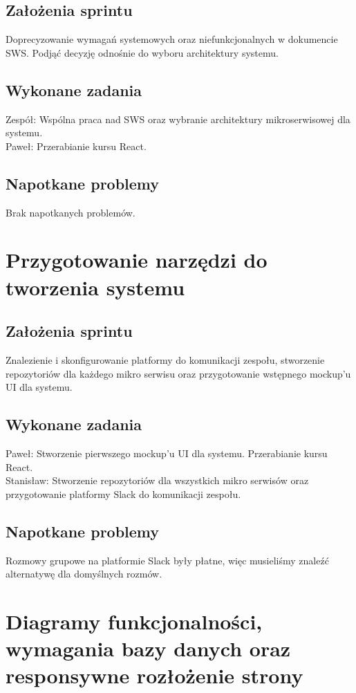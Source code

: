 \documentclass[a4paper,11pt]{report}
\begin{document}
\subsection {Założenia sprintu}
Doprecyzowanie wymagań systemowych oraz niefunkcjonalnych w dokumencie SWS. Podjąć decyzję odnośnie do wyboru architektury systemu.
\subsection {Wykonane zadania}
Zespół: Wspólna praca nad SWS oraz wybranie architektury mikroserwisowej dla systemu.\\
Paweł: Przerabianie kursu React.\\
\subsection {Napotkane problemy}
Brak napotkanych problemów.

\section {Przygotowanie narzędzi do tworzenia systemu}
\subsection {Założenia sprintu}
Znalezienie i skonfigurowanie platformy do komunikacji zespołu, stworzenie repozytoriów dla każdego mikro serwisu oraz przygotowanie wstępnego mockup'u UI dla systemu.
\subsection {Wykonane zadania}
Paweł: Stworzenie pierwszego mockup'u UI dla systemu. Przerabianie kursu React. \\
Stanisław: Stworzenie repozytoriów dla wszystkich mikro serwisów oraz przygotowanie platformy Slack do komunikacji zespołu.\\
\subsection {Napotkane problemy}
Rozmowy grupowe na platformie Slack były płatne, więc musieliśmy znaleźć alternatywę dla domyślnych rozmów.

\section {Diagramy funkcjonalności, wymagania bazy danych oraz responsywne rozłożenie strony}
\end{document}

